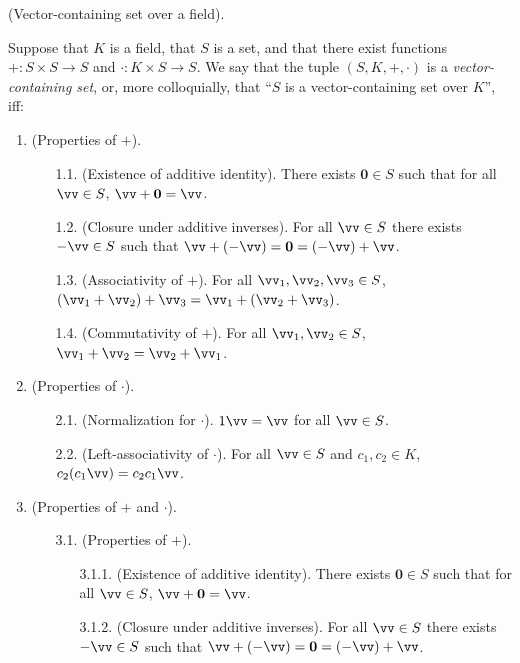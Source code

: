 \begin{defn}
\label{ch::lin_alg::defn::vector_space}
    (Vector-containing set over a field).
    
    Suppose that $K$ is a field, that $S$ is a set, and that there exist functions $+:S \times S \rightarrow S$ and $\cdot:K \times S \rightarrow S$. We say that the tuple $(S, K, +, \cdot)$ is a \textit{vector-containing set}, or, more colloquially, that ``$S$ is a vector-containing set over $K$'', iff:
    
    \begin{enumerate}
        \item (Properties of $+$).
        \begin{enumerate}
                \item[1.1.] (Existence of additive identity). There exists $\mathbf{0} \in S$ such that for all $\vv \in S$, $\vv + \mathbf{0} = \vv$.
                \item[1.2.] (Closure under additive inverses). For all $\vv \in S$ there exists $-\vv \in S$ such that $\vv + (-\vv) = \mathbf{0} = (-\vv) + \vv$.
                \item[1.3.] (Associativity of $+$). For all $\vv_1, \vv_2, \vv_3 \in S$, $(\vv_1 + \vv_2) + \vv_3 = \vv_1 + (\vv_2 + \vv_3)$.
                \item[1.4.] (Commutativity of $+$). For all $\vv_1, \vv_2 \in S$, $\vv_1 + \vv_2 = \vv_2 + \vv_1$.
            \end{enumerate}
        \item (Properties of $\cdot$).
        \begin{enumerate}
            \item[2.1.] (Normalization for $\cdot$). $1 \vv = \vv$ for all $\vv \in S$.
            \item[2.2.] (Left-associativity of $\cdot$). For all $\vv \in S$ and $c_1, c_2 \in K$, $c_2 (c_1 \vv) = c_2 c_1 \vv$.
        \end{enumerate}
        \item (Properties of $+$ and $\cdot$).
        \begin{enumerate}
            \item[3.1.] (Properties of $+$).
            \begin{enumerate}
                \item[3.1.1.] (Existence of additive identity). There exists $\mathbf{0} \in S$ such that for all $\vv \in S$, $\vv + \mathbf{0} = \vv$.
                \item[3.1.2.] (Closure under additive inverses). For all $\vv \in S$ there exists $-\vv \in S$ such that $\vv + (-\vv) = \mathbf{0} = (-\vv) + \vv$.

\end{enumerate}
\end{enumerate}
\end{enumerate}
\end{defn}
